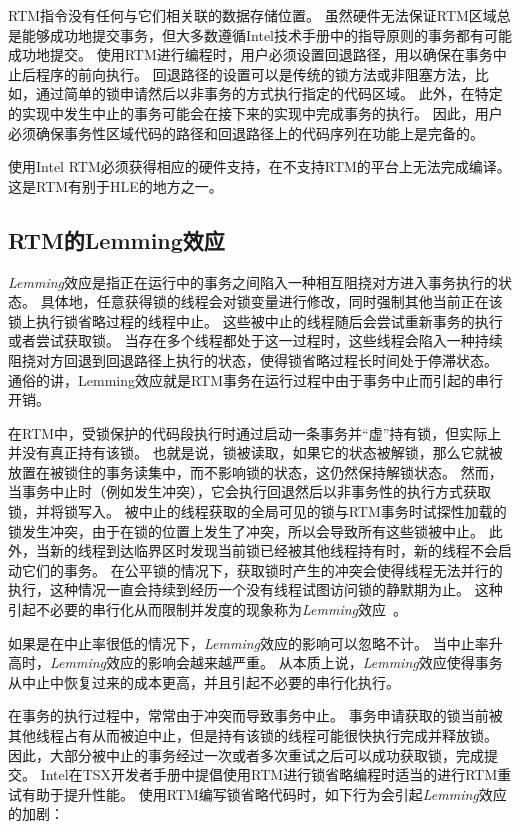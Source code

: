 RTM指令没有任何与它们相关联的数据存储位置。
虽然硬件无法保证RTM区域总是能够成功地提交事务，但大多数遵循Intel技术手册中的指导原则的事务都有可能成功地提交。
使用RTM进行编程时，用户必须设置回退路径，用以确保在事务中止后程序的前向执行。
回退路径的设置可以是传统的锁方法或非阻塞方法，比如，通过简单的锁申请然后以非事务的方式执行指定的代码区域。
此外，在特定的实现中发生中止的事务可能会在接下来的实现中完成事务的执行。
因此，用户必须确保事务性区域代码的路径和回退路径上的代码序列在功能上是完备的。

使用Intel RTM必须获得相应的硬件支持，在不支持RTM的平台上无法完成编译。
这是RTM有别于HLE的地方之一。

\subsection{RTM的Lemming效应}
\textit{Lemming}效应是指正在运行中的事务之间陷入一种相互阻挠对方进入事务执行的状态。
具体地，任意获得锁的线程会对锁变量进行修改，同时强制其他当前正在该锁上执行锁省略过程的线程中止。
这些被中止的线程随后会尝试重新事务的执行或者尝试获取锁。
当存在多个线程都处于这一过程时，这些线程会陷入一种持续阻挠对方回退到回退路径上执行的状态，使得锁省略过程长时间处于停滞状态。
通俗的讲，Lemming效应就是RTM事务在运行过程中由于事务中止而引起的串行开销。

在RTM中，受锁保护的代码段执行时通过启动一条事务并“虚”持有锁，但实际上并没有真正持有该锁。
也就是说，锁被读取，如果它的状态被解锁，那么它就被放置在被锁住的事务读集中，而不影响锁的状态，这仍然保持解锁状态。
然而，当事务中止时（例如发生冲突），它会执行回退然后以非事务性的执行方式获取锁，并将锁写入。
被中止的线程获取的全局可见的锁与RTM事务时试探性加载的锁发生冲突，由于在锁的位置上发生了冲突，所以会导致所有这些锁被中止。
此外，当新的线程到达临界区时发现当前锁已经被其他线程持有时，新的线程不会启动它们的事务。
在公平锁的情况下，获取锁时产生的冲突会使得线程无法并行的执行，这种情况一直会持续到经历一个没有线程试图访问锁的静默期为止。
这种引起不必要的串行化从而限制并发度的现象称为\textit{Lemming}效应~\cite{Dice2008Applications}。


如果是在中止率很低的情况下，\textit{Lemming}效应的影响可以忽略不计。
当中止率升高时，\textit{Lemming}效应的影响会越来越严重。
从本质上说，\textit{Lemming}效应使得事务从中止中恢复过来的成本更高，并且引起不必要的串行化执行。

在事务的执行过程中，常常由于冲突而导致事务中止。
事务申请获取的锁当前被其他线程占有从而被迫中止，但是持有该锁的线程可能很快执行完成并释放锁。
因此，大部分被中止的事务经过一次或者多次重试之后可以成功获取锁，完成提交。
Intel在TSX开发者手册中提倡使用RTM进行锁省略编程时适当的进行RTM重试有助于提升性能。
使用RTM编写锁省略代码时，如下行为会引起\textit{Lemming}效应的加剧：

